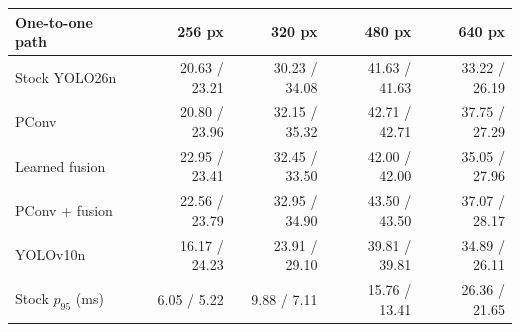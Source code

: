\begin{tabular}{lrrrr}\hline
One-to-one path & 256 px & 320 px & 480 px & 640 px \\ \hline
Stock YOLO26n & 20.63 / 23.21 & 30.23 / 34.08 & 41.63 / 41.63 & 33.22 / 26.19 \\
PConv & 20.80 / 23.96 & 32.15 / 35.32 & 42.71 / 42.71 & 37.75 / 27.29 \\
Learned fusion & 22.95 / 23.41 & 32.45 / 33.50 & 42.00 / 42.00 & 35.05 / 27.96 \\
PConv + fusion & 22.56 / 23.79 & 32.95 / 34.90 & 43.50 / 43.50 & 37.07 / 28.17 \\
YOLOv10n & 16.17 / 24.23 & 23.91 / 29.10 & 39.81 / 39.81 & 34.89 / 26.11 \\
Stock $p_{95}$ (ms) & 6.05 / 5.22 & 9.88 / 7.11 & 15.76 / 13.41 & 26.36 / 21.65 \\
\hline\end{tabular}

